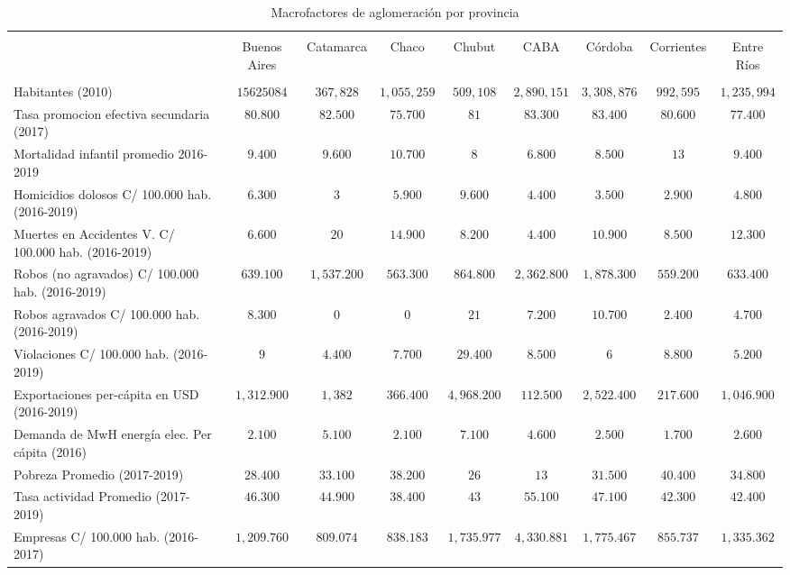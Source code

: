 \documentclass[12pt,a4paper]{article}
\begin{document}
\begin{table} \centering \tiny
 \centering 
  \caption{Macrofactores de aglomeración por provincia} 
  \label{} 
\begin{tabular}{@{\extracolsep{5pt}} lcccccccc} 
\\[-1.8ex]\hline 
\hline \\[-1.8ex] 
 & Buenos Aires & Catamarca & Chaco & Chubut & CABA & Córdoba & Corrientes & Entre Ríos \\ 
\hline \\[-1.8ex] 
Habitantes (2010) & $15625084$ & $367,828$ & $1,055,259$ & $509,108$ & $2,890,151$ & $3,308,876$ & $992,595$ & $1,235,994$ \\ 
Tasa promocion efectiva secundaria (2017) & $80.800$ & $82.500$ & $75.700$ & $81$ & $83.300$ & $83.400$ & $80.600$ & $77.400$ \\ 
Mortalidad infantil promedio 2016-2019 & $9.400$ & $9.600$ & $10.700$ & $8$ & $6.800$ & $8.500$ & $13$ & $9.400$ \\ 
Homicidios dolosos C/ 100.000 hab. (2016-2019) & $6.300$ & $3$ & $5.900$ & $9.600$ & $4.400$ & $3.500$ & $2.900$ & $4.800$ \\ 
Muertes en Accidentes V. C/ 100.000  hab.  (2016-2019) & $6.600$ & $20$ & $14.900$ & $8.200$ & $4.400$ & $10.900$ & $8.500$ & $12.300$ \\ 
Robos (no agravados) C/ 100.000 hab. (2016-2019) & $639.100$ & $1,537.200$ & $563.300$ & $864.800$ & $2,362.800$ & $1,878.300$ & $559.200$ & $633.400$ \\ 
Robos agravados C/ 100.000 hab. (2016-2019) & $8.300$ & $0$ & $0$ & $21$ & $7.200$ & $10.700$ & $2.400$ & $4.700$ \\ 
Violaciones  C/ 100.000 hab. (2016-2019) & $9$ & $4.400$ & $7.700$ & $29.400$ & $8.500$ & $6$ & $8.800$ & $5.200$ \\ 
Exportaciones per-cápita en USD (2016-2019) & $1,312.900$ & $1,382$ & $366.400$ & $4,968.200$ & $112.500$ & $2,522.400$ & $217.600$ & $1,046.900$ \\ 
Demanda de MwH energía elec. Per cápita (2016) & $2.100$ & $5.100$ & $2.100$ & $7.100$ & $4.600$ & $2.500$ & $1.700$ & $2.600$ \\ 
Pobreza Promedio (2017-2019) & $28.400$ & $33.100$ & $38.200$ & $26$ & $13$ & $31.500$ & $40.400$ & $34.800$ \\ 
Tasa actividad Promedio (2017-2019) & $46.300$ & $44.900$ & $38.400$ & $43$ & $55.100$ & $47.100$ & $42.300$ & $42.400$ \\ 
Empresas  C/ 100.000 hab. (2016-2017) & $1,209.760$ & $809.074$ & $838.183$ & $1,735.977$ & $4,330.881$ & $1,775.467$ & $855.737$ & $1,335.362$ \\ 

\end{tabular}
\end{table}
\end{document}
